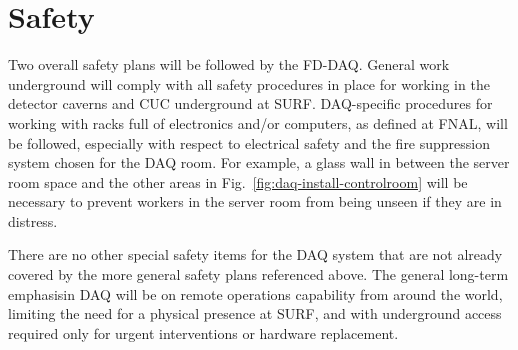 \section{Safety}
\label{sec:fd-daq-safety}

Two overall safety plans will be followed by the FD-DAQ. General work underground will comply with all safety procedures in place for working in the detector caverns and CUC underground at SURF. DAQ-specific procedures for working with racks full of electronics and/or computers, as defined at FNAL, will be followed, especially with respect to electrical safety and the fire suppression system chosen for the DAQ room. For example, a glass wall in between the server room space and the other areas in Fig.~\ref{fig:daq-install-controlroom} will be necessary to prevent workers in the server room from being unseen if they are in distress.

There are no other special safety items for the DAQ system that are not already covered by the more general safety plans referenced above. The general long-term emphasisin DAQ will be on remote operations capability from around the world, limiting the need for a physical presence at SURF, and with underground access required only for urgent interventions or hardware replacement.
